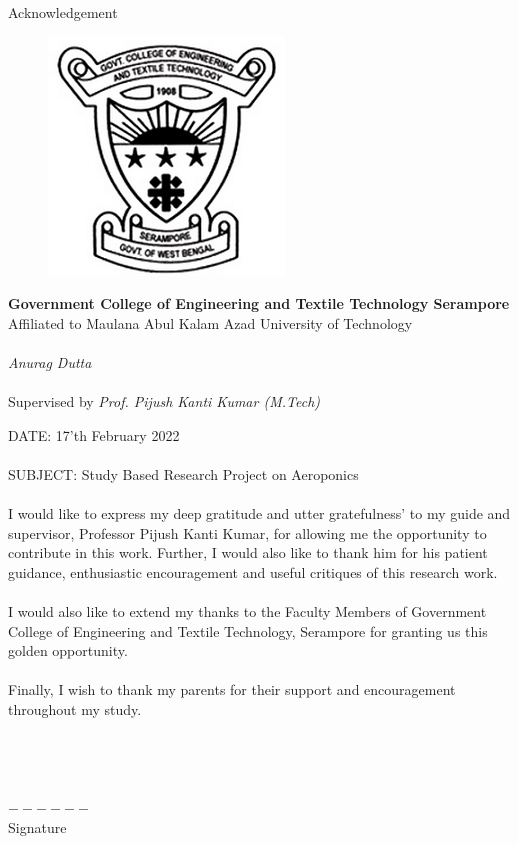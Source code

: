 \documentclass{article}
\begin{document}
\begin{Huge}
\begin{center}
    Acknowledgement
\end{center}
\end{Huge}
\begin{figure}
\begin{center}
  \includegraphics[width=0.25\linewidth]{1.jpg}
\end{center}
\end{figure}
\begin{center}
\textbf{Government College of Engineering and Textile Technology Serampore}\\
Affiliated to Maulana Abul Kalam Azad University of Technology\\
\textit{\\}
\textit{Anurag Dutta}\\
\textit{\\}
Supervised by \textit{Prof. Pijush Kanti Kumar (M.Tech)}
\end{center}
DATE: 17'th February 2022\\\\
SUBJECT: Study Based Research Project on Aeroponics\\\\
I would like to express my deep gratitude and utter gratefulness’ to my guide and supervisor, Professor Pijush Kanti Kumar, for allowing me the opportunity to contribute in this work. Further, I would also like to thank him for his patient guidance, enthusiastic encouragement and useful critiques of this research work. \\\\
I would also like to extend my thanks to the Faculty Members of Government College of Engineering and Textile Technology, Serampore for granting us this golden opportunity.\\\\
Finally, I wish to thank my parents for their support and encouragement throughout my study.\\\\\\\\\\
$------$\\
Signature
\end{document}
